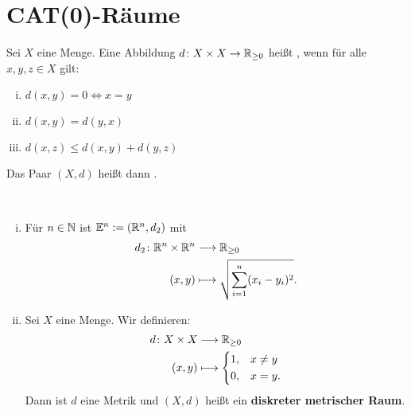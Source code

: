 \chapter{CAT(0)-Räume} %
\label{cha:1}

\begin{definition}
\label{def:1.1}
	Sei $X$ eine Menge.
	Eine Abbildung $d \colon X \times X \rightarrow \mathbb{R}_{\geq 0}$ heißt , wenn für alle $x,y,z \in X$ gilt:
	\begin{enumerate}[(i)]
		\item $d(x,y) = 0 \Leftrightarrow x=y$
		\item $d(x,y) = d(y,x)$
		\item $d(x,z) \leq d(x,y) + d(y,z)$
	\end{enumerate}
	Das Paar $(X,d)$ heißt dann .
\end{definition}

\begin{beispiel}
\label{bsp:1.2}
	\mbox{} \\[-1.4cm]
	\begin{enumerate}[(i)]
		\item Für $n \in \mathbb{N}$ ist $\mathbb{E}^n := (\mathbb{R}^n,d_2)$ mit
		\begin{align*}
			d_2\colon \mathbb{R}^n \times \mathbb{R}^n &\longrightarrow \mathbb{R}_{\geq 0} \\
			(x,y) &\longmapsto \sqrt{\sum_{i=1}^{n} (x_i-y_i)^2}.
		\end{align*}
		\item Sei $X$ eine Menge.
		Wir definieren:
		\begin{align*}
			d\colon X \times X &\longrightarrow \mathbb{R}_{\geq 0} \\
			(x,y) &\longmapsto \begin{dcases}
				1, & x \neq y \\
				0, & x = y.
			\end{dcases}
		\end{align*}
		Dann ist $d$ eine Metrik und $(X,d)$ heißt ein \textbf{diskreter metrischer Raum}. 
	\end{enumerate}
\end{beispiel}

